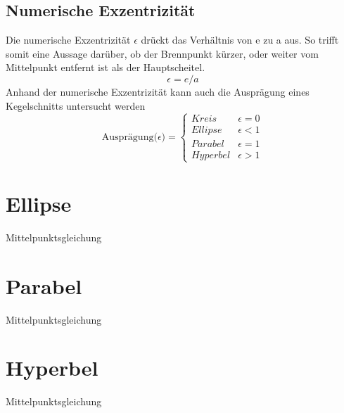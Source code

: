 \subsection{Numerische Exzentrizität}
Die numerische Exzentrizität $\epsilon$ drückt das Verhältnis von e zu a aus. So trifft somit eine Aussage darüber, ob der Brennpunkt kürzer, oder weiter vom Mittelpunkt entfernt ist als der Hauptscheitel.
\begin{displaymath}
	\epsilon = e/a
\end{displaymath}
Anhand der numerische Exzentrizität kann auch die Ausprägung eines Kegelschnitts untersucht werden 
\begin{displaymath}
   \text{Ausprägung($\epsilon$)} = \left\{
     \begin{array}{lr}
       Kreis & \epsilon = 0 \\
       Ellipse & \epsilon < 1\\
       Parabel & \epsilon = 1\\
       Hyperbel & \epsilon > 1
     \end{array}
   \right.
\end{displaymath}
\section{Ellipse}
Mittelpunktsgleichung
\section{Parabel}
Mittelpunktsgleichung
\section{Hyperbel}
Mittelpunktsgleichung